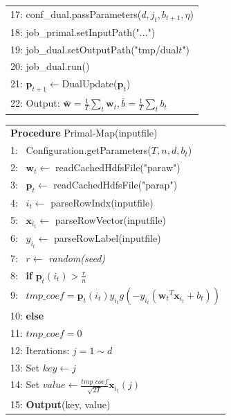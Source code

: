 \documentclass[10pt, conference, compsocconf]{IEEEtran}
\newcommand{\bw}{\mathbf{w}}
\newcommand{\bp}{\mathbf{p}}
\newcommand{\lc}{\left(}
\newcommand{\rc}{\right)}
\newcommand{\tspace}{\hspace*{2em}}
\newcommand{\tspaces}{\hspace*{1.5em}}
\begin{document}
\begin{table}[ht]
\begin{tabular}{l}
    17: \tspaces conf\_dual.passParameters($d, j_t, b_{t+1}, \eta$) \\
    18: \tspaces job\_primal.setInputPath("...") \\	
    19:	\tspaces job\_dual.setOutputPath("tmp/dual$t$") \\
    20: \tspaces job\_dual.run() \\	
    21: \tspaces $\bp_{t+1}$$\leftarrow$DualUpdate($\bp_t$) \\
    22: Output: $\bar{\bw}=\frac{1}{T}\sum_{t}{\bw}_{t},\bar{b}=\frac{1}{T}\sum_{t}{b}_{t}$ \\
	\hline
	\end{tabular}
	\end{table}

    \begin{table}[ht]
	\begin{tabular}{l}
	\hline\noalign{\smallskip}
	\textbf{Procedure} Primal-Map(inputfile) \\
	\noalign{\smallskip}
	\hline
	\noalign{\smallskip}
    1:  ~Configuration.getParameters($T, n, d, b_t$) \\
    2:  ~$\bw_t \leftarrow$ readCachedHdfsFile("paraw") \\
    3:  ~$\bp_t \leftarrow$ readCachedHdfsFile("parap") \\
    4:  ~$i_t \leftarrow$ parseRowIndx(inputfile)\\
    5:  ~$\mathbf{x}_{i_t} \leftarrow$ parseRowVector(inputfile) \\
    6:  ~$y_{i_t} \leftarrow$ parseRowLabel(inputfile) \\
    7:  ~$r \leftarrow$ \textit{random(seed)} \\
    8:  ~\textbf{if} $\bp_t(i_t) > \frac{r}{n}$ \\
    9:  ~\tspace $tmp\_coef=\bp_t(i_t){y}_{{i}_{t}}g\lc-{y}_{{i}_{t}}\lc {{\bw}_{t}}^{T}{\mathbf{x}}_{i_t}+{b}_{t} \rc\rc$ \\
    10: \textbf{else} \\
    11: \tspace $tmp\_coef=0$ \\
    12: Iterations: $j=1 \sim d$ \\
    13: \tspace Set $key \leftarrow j$ \\
    14: \tspace Set $value \leftarrow \frac{tmp\_coef}{\sqrt{2T}}\mathbf{x}_{i_t}(j) $ \\
    15: \tspace \textbf{Output}(key, value) \\
	\hline
	\end{tabular}
	\end{table}
\end{document}
